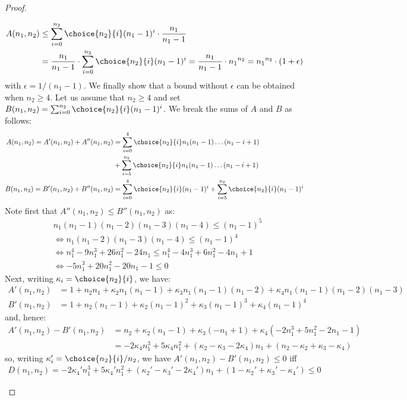 \begin{proof}
\begin{enumerate}
\begin{align*}
A(n_1,n_2) &\le \sum^{n_2}_{i = 0} 
		\choice{n_2}{i}
		(n_1-1)^i \cdot \frac{n_1}{n_1 - 1}
        \\ &
=  \frac{n_1}{n_1 - 1}\cdot\sum^{n_2}_{i = 0} 
		\choice{n_2}{i}
		(n_1-1)^i 
=  \frac{n_1}{n_1 - 1}\cdot {n_1}^{n_2}=  {n_1}^{n_2}\cdot (1 + \epsilon) 
      \end{align*}
      with $\epsilon=1/(n_1-1)$. We finally show that a bound without $\epsilon$ can be obtained when $n_2\ge 4$. Let us assume that $n_2\ge 4$ and set
      $B(n_1,n_2)=\sum^{n_2}_{i = 0} \choice{n_2}{i} (n_1-1)^i$. We break the sums of $A$ and $B$ as follows:
      \begin{align*}
        A(n_1,n_2) = A'(n_1,n_2)+A''(n_1,n_2) &=
\sum^{4}_{i = 0} \choice{n_2}{i} n_1(n_1 - 1)\dots(n_1 - i + 1)\\ & +
\sum^{n_2}_{i = 5} \choice{n_2}{i} n_1(n_1 - 1)\dots(n_1 - i + 1)\\
B(n_1,n_2) = B'(n_1,n_2)+B''(n_1,n_2) &=
\sum^{4}_{i = 0} \choice{n_2}{i} (n_1 - 1)^i+
\sum^{n_2}_{i = 5} \choice{n_2}{i} (n_1 - 1)^i
\end{align*}                                                
Note first that $A''(n_1,n_2)\leq B''(n_1,n_2)$ as:
\begin{align*}
& n_1(n_1-1)(n_1-2)(n_1-3)(n_1-4)\leq (n_1-1)^5\\
&\iff n_1(n_1-2)(n_1-3)(n_1-4)\leq (n_1-1)^4 \\
&\iff n_1^4-9n_1^3+26n_1^2-24n_1\leq n_1^4-4n_1^3+6n_1^2-4n_1+1\\
&\iff -5n_1^3+20n_1^2-20n_1-1\leq 0
\end{align*}
Next, writing $\kappa_i=\choice{n_2}{i}$, we have:
\begin{align*}
  A'(n_1,n_2) &= 1+n_2n_1+\kappa_2n_1(n_1-1)+\kappa_3n_1(n_1-1)(n_1-2)+\kappa_4n_1(n_1-1)(n_1-2)(n_1-3)\\
 B'(n_1,n_2) &= 1+n_2(n_1-1)+\kappa_2(n_1-1)^2+\kappa_3(n_1-1)^3+\kappa_4(n_1-1)^4
\end{align*}
and, hence:
\begin{align*}
  A'(n_1,n_2)-B'(n_1,n_2) &= n_2+\kappa_2(n_1-1)+\kappa_3(-n_1+1)+\kappa_4(-2n_1^3+5n_1^2-2n_1-1)\\
  &= -2\kappa_4n_1^3+5\kappa_4n_1^2+(\kappa_2-\kappa_3-2\kappa_4)n_1+(n_2-\kappa_2+\kappa_3-\kappa_4)
\end{align*}
so, writing $\kappa'_i=\choice{n_2}{i}/n_2$, we have $A'(n_1,n_2)-B'(n_1,n_2)\leq 0$ iff
\begin{align*}
D(n_1,n_2) = -2\kappa_4'n_1^3+5\kappa_4'n_1^2+(\kappa_2'-\kappa_3'-2\kappa_4')n_1+(1-\kappa_2'+\kappa_3'-\kappa_4')\leq0

\end{align*}
\end{enumerate}
\end{proof}
